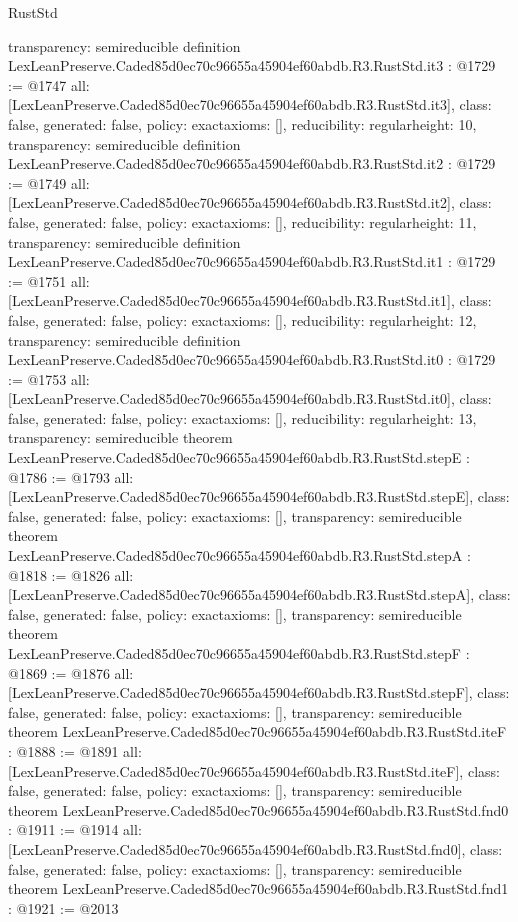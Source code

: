 \begin{lexlean}{RustStd}
\begin{coremodule}
{  transparency: semireducible
}
definition LexLeanPreserve.Caded85d0ec70c96655a45904ef60abdb.R3.RustStd.it3 : @1729 := @1747 {
  all: [LexLeanPreserve.Caded85d0ec70c96655a45904ef60abdb.R3.RustStd.it3],
  class: false,
  generated: false,
  policy: exact{axioms: []},
  reducibility: regular{height: 10},
  transparency: semireducible
}
definition LexLeanPreserve.Caded85d0ec70c96655a45904ef60abdb.R3.RustStd.it2 : @1729 := @1749 {
  all: [LexLeanPreserve.Caded85d0ec70c96655a45904ef60abdb.R3.RustStd.it2],
  class: false,
  generated: false,
  policy: exact{axioms: []},
  reducibility: regular{height: 11},
  transparency: semireducible
}
definition LexLeanPreserve.Caded85d0ec70c96655a45904ef60abdb.R3.RustStd.it1 : @1729 := @1751 {
  all: [LexLeanPreserve.Caded85d0ec70c96655a45904ef60abdb.R3.RustStd.it1],
  class: false,
  generated: false,
  policy: exact{axioms: []},
  reducibility: regular{height: 12},
  transparency: semireducible
}
definition LexLeanPreserve.Caded85d0ec70c96655a45904ef60abdb.R3.RustStd.it0 : @1729 := @1753 {
  all: [LexLeanPreserve.Caded85d0ec70c96655a45904ef60abdb.R3.RustStd.it0],
  class: false,
  generated: false,
  policy: exact{axioms: []},
  reducibility: regular{height: 13},
  transparency: semireducible
}
theorem LexLeanPreserve.Caded85d0ec70c96655a45904ef60abdb.R3.RustStd.stepE : @1786 := @1793 {
  all: [LexLeanPreserve.Caded85d0ec70c96655a45904ef60abdb.R3.RustStd.stepE],
  class: false,
  generated: false,
  policy: exact{axioms: []},
  transparency: semireducible
}
theorem LexLeanPreserve.Caded85d0ec70c96655a45904ef60abdb.R3.RustStd.stepA : @1818 := @1826 {
  all: [LexLeanPreserve.Caded85d0ec70c96655a45904ef60abdb.R3.RustStd.stepA],
  class: false,
  generated: false,
  policy: exact{axioms: []},
  transparency: semireducible
}
theorem LexLeanPreserve.Caded85d0ec70c96655a45904ef60abdb.R3.RustStd.stepF : @1869 := @1876 {
  all: [LexLeanPreserve.Caded85d0ec70c96655a45904ef60abdb.R3.RustStd.stepF],
  class: false,
  generated: false,
  policy: exact{axioms: []},
  transparency: semireducible
}
theorem LexLeanPreserve.Caded85d0ec70c96655a45904ef60abdb.R3.RustStd.iteF : @1888 := @1891 {
  all: [LexLeanPreserve.Caded85d0ec70c96655a45904ef60abdb.R3.RustStd.iteF],
  class: false,
  generated: false,
  policy: exact{axioms: []},
  transparency: semireducible
}
theorem LexLeanPreserve.Caded85d0ec70c96655a45904ef60abdb.R3.RustStd.fnd0 : @1911 := @1914 {
  all: [LexLeanPreserve.Caded85d0ec70c96655a45904ef60abdb.R3.RustStd.fnd0],
  class: false,
  generated: false,
  policy: exact{axioms: []},
  transparency: semireducible
}
theorem LexLeanPreserve.Caded85d0ec70c96655a45904ef60abdb.R3.RustStd.fnd1 : @1921 := @2013 {
}
\end{coremodule}
\end{lexlean}

